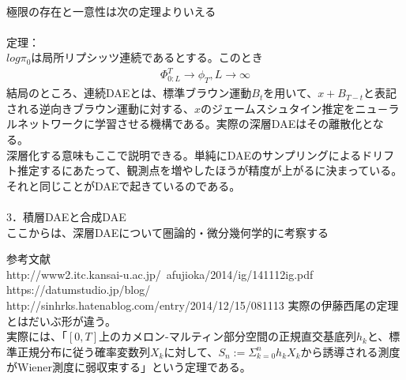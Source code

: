 \documentclass{jsarticle}
\begin{document}
　\\
極限の存在と一意性は次の定理よりいえる\\ 
　\\
定理：\\
$log \pi_0$は局所リプシッツ連続であるとする。このとき
\begin{eqnarray}
\Phi^T_{0:L}\rightarrow \phi_T ,L\rightarrow \infty
\end{eqnarray}
結局のところ、連続DAEとは、標準ブラウン運動$B_t$を用いて、$x+B_{T-t}$と表記される逆向きブラウン運動に対する、$x$のジェームスシュタイン推定をニュ－ラルネットワークに学習させる機構である。実際の深層DAEはその離散化となる。\\
深層化する意味もここで説明できる。単純にDAEのサンプリングによるドリフト推定するにあたって、観測点を増やしたほうが精度が上がるに決まっている。それと同じことがDAEで起きているのである。\\
　\\
3．積層DAEと合成DAE\\
ここからは、深層DAEについて圏論的・微分幾何学的に考察する



\newpage
参考文献\\
http://www2.itc.kansai-u.ac.jp/~afujioka/2014/ig/141112ig.pdf
https://datumstudio.jp/blog/\\
http://sinhrks.hatenablog.com/entry/2014/12/15/081113
実際の伊藤西尾の定理とはだいぶ形が違う。\\
実際には、「$[0,T]$上のカメロン-マルティン部分空間の正規直交基底列$h_k$と、標準正規分布に従う確率変数列$X_k$に対して、$S_n:=\Sigma^n_{k=0}h_kX_k$から誘導される測度がWiener測度に弱収束する」という定理である。
　\\
　
\end{document}
